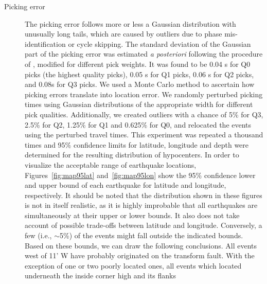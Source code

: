 \documentclass[jgr]{agu2001}
\newlength{\tw}
\begin{document}
\begin{article}
\begin{description}
\item[Picking error]
The picking error follows more or less a Gaussian distribution with
unusually long tails, which are caused by outliers due to phase mis-identification
or cycle skipping.   The standard deviation of the Gaussian
part of the picking
error was estimated {\it a posteriori} following the procedure of \citet{wilcock91},
modified for different pick weights.  It was found to be 0.04 s for
Q0 picks (the highest quality picks), 0.05 s for Q1 picks, 0.06 s for Q2 picks, and 0.08s
for Q3 picks.    We  used a Monte Carlo method to ascertain how picking errors
translate into location error. We randomly perturbed picking times
using Gaussian distributions of the appropriate width for different pick
qualities.  Additionally, we created outliers with
a chance of 5\% for Q3, 2.5\% for Q2, 1.25\% for Q1 and 0.625\% for
Q0, and relocated the events using the perturbed travel times. This
experiment was repeated a thousand times and 95\% confidence limits for
latitude, longitude and depth were determined for the resulting distribution of
hypocenters.  
 In order to visualize the acceptable range
of earthquake locations, Figures~\ref{fig:map95lat}
and~\ref{fig:map95lon} show the 95\% confidence lower and upper bound of each
earthquake for latitude and longitude, respectively. It should be
noted that the distribution shown in these figures is not in itself realistic, as it is
highly improbable that all earthquakes are simultaneously at their
upper or lower bounds. It also does not take account of possible
trade-offs between latitude and longitude.  Conversely, a few
(i.e., $\sim$5\%) of the events might fall outside the indicated
bounds.  Based on these bounds, we can draw the following conclusions.
All events west of 11' W  have probably originated on the transform
fault.  With the exception of one or two poorly located ones, all
events which located underneath the inside corner high and its flanks

\end{description}
\end{article}
\end{document}
